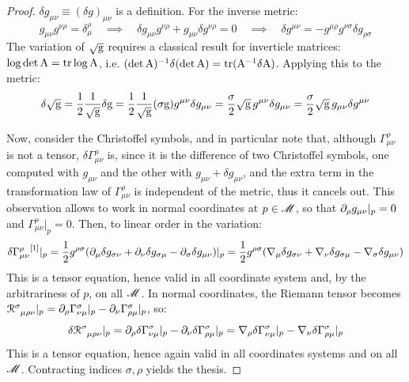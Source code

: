 \begin{proofbox}
  \begin{proof}
    $ \delta g_{\mu \nu} \equiv (\delta g)_{\mu \nu} $ is a definition. For the inverse metric:
    \begin{equation*}
      g_{\mu \nu} g^{\nu \rho} = \delta_\mu^\rho
      \quad \implies \quad
      \delta g_{\mu \nu} g^{\nu \rho} + g_{\mu \nu} \delta g^{\nu \rho} = 0
      \quad \implies \quad
      \delta g^{\mu \nu} = - g^{\mu \rho} g^{\nu \sigma} \delta g_{\rho \sigma}
    \end{equation*}
    The variation of $ \sqrt{\mathrm{g}} $ requires a classical result for inverticle matrices: $ \log \det \mathrm{A} = \operatorname{tr} \log \mathrm{A} $, i.e. $ (\det \mathrm{A})^{-1} \delta (\det \mathrm{A}) = \operatorname{tr} (\mathrm{A}^{-1} \delta \mathrm{A}) $. Applying this to the metric:
    \begin{equation*}
      \delta \sqrt{\mathrm{g}} = \frac{1}{2} \frac{1}{\sqrt{\mathrm{g}}} \delta \mathrm{g} = \frac{1}{2} \frac{1}{\sqrt{\mathrm{g}}} (\sigma \mathrm{g}) g^{\mu \nu} \delta g_{\mu \nu} = \frac{\sigma}{2} \sqrt{\mathrm{g}}\, g^{\mu \nu} \delta g_{\mu \nu} = \frac{\sigma}{2} \sqrt{\mathrm{g}}\, g_{\mu \nu} \delta g^{\mu \nu}
    \end{equation*}

    Now, consider the Christoffel symbols, and in particular note that, although $ \Gamma^\rho_{\mu \nu} $ is not a tensor, $ \delta \Gamma^\rho_{\mu \nu} $ is, since it is the difference of two Christoffel symbols, one computed with $ g_{\mu \nu} $ and the other with $ g_{\mu \nu} + \delta g_{\mu \nu} $, and the extra term in the transformation law of $ \Gamma^\rho_{\mu \nu} $ is independent of the metric, thus it cancels out. This observation allows to work in normal coordinates at $ p \in \mathscr{M} $, so that $ \partial_\rho g_{\mu \nu} \vert_p = 0 $ and $ \Gamma^\rho_{\mu \nu} \vert_p = 0 $. Then, to linear order in the variation:
    \begin{equation*}
      {\delta \Gamma^\rho_{\mu \nu}}^{[1]} \vert_p = \frac{1}{2} g^{\rho \sigma} ( \partial_\mu \delta g_{\sigma \nu} + \partial_\nu \delta g_{\sigma \mu} - \partial_\sigma \delta g_{\mu \nu} ) \vert_p = \frac{1}{2} g^{\rho \sigma} ( \nabla_\mu \delta g_{\sigma \nu} + \nabla_\nu \delta g_{\sigma \mu} - \nabla_\sigma \delta g_{\mu \nu} )
    \end{equation*}
    This is a tensor equation, hence valid in all coordinate system and, by the arbitrariness of $ p $, on all $ \mathscr{M} $.
    In normal coordinates, the Riemann tensor becomes $ \tensor{\rr}{^\sigma_{\mu \rho \nu}} \vert_p = \pa_\rho \Gamma^\sigma_{\nu \mu} \vert_p - \pa_\nu \Gamma^\sigma_{\rho \mu} \vert_p $, so:
    \begin{equation*}
      \delta \tensor{\rr}{^\sigma_{\mu \rho \nu}} \vert_p = \pa_\rho \delta \Gamma^\sigma_{\nu \mu} \vert_p - \pa_\nu \delta \Gamma^\sigma_{\rho \mu} \vert_p = \na_\rho \delta \Gamma^\sigma_{\nu \mu} \vert_p - \na_\nu \delta \Gamma^\sigma_{\rho \mu} \vert_p
    \end{equation*}
    This is a tensor equation, hence again valid in all coordinates systems and on all $ \mathscr{M} $. Contracting indices $ \sigma,\rho $ yields the thesis.
  \end{proof}
\end{proofbox}


